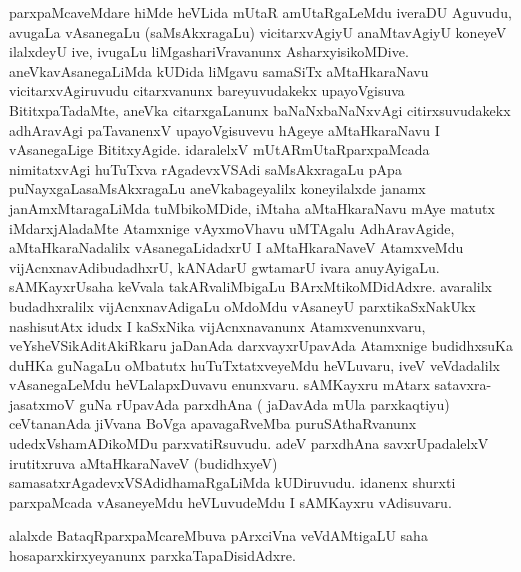 \begin{artha}
parxpaMcaveMdare hiMde heVLida mUtaR amUtaRgaLeMdu iveraDU \break Aguvudu,
avugaLa vAsanegaLu (saMsAkxragaLu) vicitarxvAgiyU anaMtavAgiyU
koneyeV ilalxdeyU ive, ivugaLu liMgashariVravanunx
AsharxyisikoMDive. aneVka\-vAsanegaLiMda kUDida liMgavu samaSiTx
aMtaHkaraNavu vicitarxvAgiruvudu \-citarxvanunx bareyuvudakekx
upayoVgisuva BititxpaTadaMte, aneVka citarxgaLanunx baNaNxbaNaNxvAgi
citirxsuvudakekx adhAravAgi paTavanenxV upayoVgisuvevu hAgeye
aMtaHkaraNavu I vAsanegaLige BititxyAgide. idaralelxV
mUtARmUtaRparxpaMcada nimitatxvAgi huTuTxva rAgadevxVSAdi
saMsAkxragaLu pApa puNayxgaLasaMsAkxragaLu aneVkabageyalilx
koneyilalxde janamx janAmxMtaragaLiMda tuMbikoMDide, iMtaha
aMtaHkaraNavu mAye matutx iMdarxjAladaMte Atamxnige vAyxmoVhavu
uMTAgalu AdhAravAgide, aMtaH\-karaNadalilx vAsanegaLidadxrU I
aMtaHkaraNaveV AtamxveMdu vijAcnxnavAdi\break budadhxrU, kANAdarU gwtamarU
ivara anuyAyigaLu. sAMKayxrUsaha \-keVvala  takARvaliMbigaLu
BArxMtikoMDidAdxre. avaralilx budadhxralilx vijAcnxnavAdigaLu \break oMdoMdu
vAsaneyU parxtikaSxNakUkx nashisutAtx idudx I kaSxNika vijAcnxnavanunx
Atamx\-venunxvaru, veYsheVSikAditAkiRkaru jaDanAda darxvayxrUpavAda
Atamxnige budidhxsuKa duHKa guNagaLu oMbatutx huTuTxtatxveyeMdu
heVLuvaru, iveV veVdadalilx vAsane\-gaLeMdu heVLalapxDuvavu
enunxvaru. sAMKayxru mAtarx satavxra-jasatxmoV guNa rUpa\-vAda
parxdhAna ( jaDavAda mUla parxkaqtiyu) ceVtananAda jiVvana BoVga
apavagaR\-veMba puruSAthaRvanunx udedxVshamADikoMDu
parxvatiRsuvudu. adeV parxdhAna savxrUpadalelxV irutitxruva
aMtaHkaraNaveV (budidhxyeV) samasatxrAgadevxVSAdidhamaR\-gaLiMda
kUDiruvudu. idanenx shurxti parxpaMcada vAsaneyeMdu heVLuvudeMdu I
sAMKayxru vAdisuvaru.

alalxde BataqRparxpaMcareMbuva pArxciVna veVdAMtigaLU saha
hosaparxkirxye\-yanunx parxkaTapaDisidAdxre.
\end{artha}

\centerline{}

